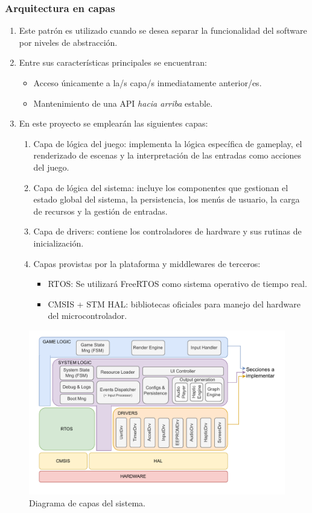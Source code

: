 \documentclass[11pt,a4paper]{article}
\begin{document}
\subsubsection{Arquitectura en capas}
\begin{enumerate}
    \item Este patrón es utilizado cuando se desea separar la funcionalidad del software por niveles de abstracción.
    \item Entre sus características principales se encuentran:
    \begin{itemize}
        \item Acceso únicamente a la/s capa/s inmediatamente anterior/es.
        \item Mantenimiento de una API \textit{hacia arriba} estable.
    \end{itemize}
    \item En este proyecto se emplearán las siguientes capas:
    \begin{enumerate}
        \item Capa de lógica del juego: implementa la lógica específica de gameplay, el renderizado de escenas y la interpretación de las entradas como acciones del juego.
        \item Capa de lógica del sistema: incluye los componentes que gestionan el estado global del sistema, la persistencia, los menús de usuario, la carga de recursos y la gestión de entradas. 
        \item Capa de drivers: contiene los controladores de hardware y sus rutinas de inicialización. 
        \item Capas provistas por la plataforma y middlewares de terceros:
        \begin{itemize}
            \item RTOS: Se utilizará FreeRTOS como sistema operativo de tiempo real. 
            \item CMSIS + STM HAL: bibliotecas oficiales para manejo del hardware del microcontrolador.
        \end{itemize}
  \end{enumerate}
\end{enumerate}

\begin{figure}[htb]
\centering 
\includegraphics[width=.85\textwidth]{../Figuras/SW_layers.pdf}
\caption{Diagrama de capas del sistema.}
\label{fig:diagCapas}
\end{figure}
\end{document}
